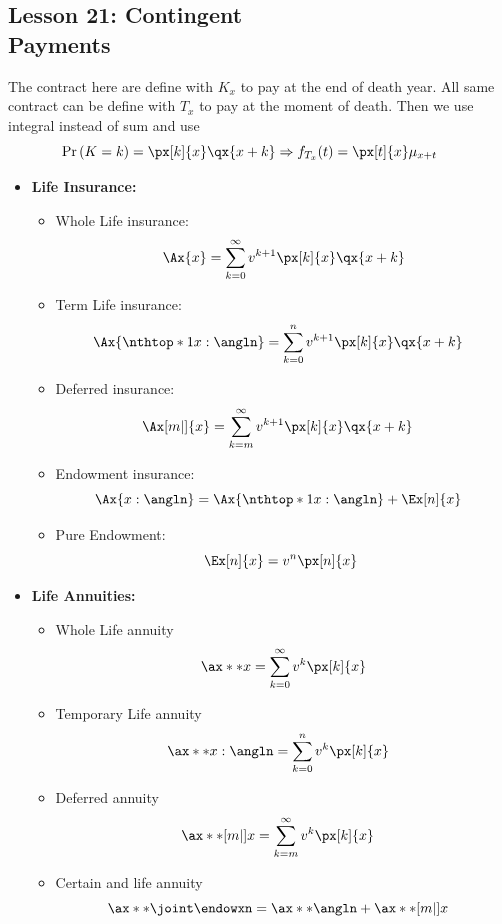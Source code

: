\documentclass[10pt, french]{article}
\begin{document}
\begin{multicols*}{3}
\section*{Lesson 21: Contingent \\ Payments}
The contract here are define with $K_x$ to pay at the end of death year. All same contract can be define with $T_x$ to pay at the moment of death. Then we use integral instead of sum and use \[\hspace*{-5mm} \prob{K=k}=\px[k]{x} \qx{x+k} \Rightarrow f_{T_x}(t) = \px[t]{x} \mu_{x+t}\]
\begin{itemize}[align=left,leftmargin=*]
    \item \textbf{Life Insurance:}
    \begin{itemize}
        \item Whole Life insurance: \[ \Ax{x} = \sum_{k=0}^\infty v^{k+1} \px[k]{x} \qx{x+k} \]
        \item Term Life insurance: \[\hspace*{-2.8mm} \Ax{\nthtop*{1}{x}:\angln} = \sum_{k=0}^n v^{k+1} \px[k]{x} \qx{x+k} \]
        \item Deferred insurance: \[\hspace*{-3mm} \Ax[m|]{x} = \sum_{k=m}^\infty v^{k+1} \px[k]{x} \qx{x+k} \]
        \item Endowment insurance: \[\hspace*{-2.8mm} \Ax{x:\angln} = \Ax{\nthtop*{1}{x}:\angln} + \Ex[n]{x} \]
        \item Pure Endowment: \[\hspace*{-1.4mm} \Ex[n]{x} = v^n \px[n]{x} \]
    \end{itemize}
    \item \textbf{Life Annuities:}
    \begin{itemize}
        \item Whole Life annuity \[ \ax**{x} = \sum_{k=0}^\infty v^k \px[k]{x} \]
        \item Temporary Life annuity \[\hspace*{-2.8mm} \ax**{x:\angln} = \sum_{k=0}^n v^k \px[k]{x} \]
        \item Deferred annuity \[\hspace*{-3mm} \ax**[m|]{x} = \sum_{k=m}^\infty v^k \px[k]{x} \]
        \item Certain and life annuity \[\hspace*{-2.8mm} \ax**{\joint\endowxn} =  \ax**{\angln} + \ax**[m|]{x} \]
    \end{itemize}

\end{itemize}
\end{multicols*}
\end{document}
